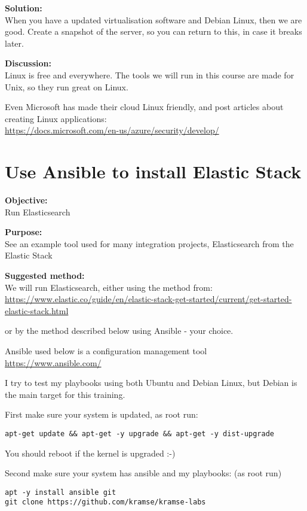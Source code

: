 \documentclass[a4paper,11pt,notitlepage]{report}
\begin{document}

{\bf Solution:}\\
When you have a updated virtualisation software and Debian Linux, then we are good.
Create a snapshot of the server, so you can return to this, in case it breaks later.

{\bf Discussion:}\\
Linux is free and everywhere. The tools we will run in this course are made for Unix, so they run great on Linux.

Even Microsoft has made their cloud Linux friendly, and post articles about creating Linux applications:\\
\url{https://docs.microsoft.com/en-us/azure/security/develop/}



\chapter{Use Ansible to install Elastic Stack}
\label{ex:basicansible}


{\bf Objective:}\\
Run Elasticsearch

{\bf Purpose:}\\
See an example tool used for many integration projects, Elasticsearch from the Elastic Stack

{\bf Suggested method:}\\
We will run Elasticsearch, either using the method from:\\{\footnotesize
\url{https://www.elastic.co/guide/en/elastic-stack-get-started/current/get-started-elastic-stack.html}}

or by the method described below using Ansible - your choice.

Ansible used below is a configuration management tool \url{https://www.ansible.com/}

I try to test my playbooks using both Ubuntu and Debian Linux, but Debian is the main target for this training.

First make sure your system is updated, as root run:

\begin{verbatim}
apt-get update && apt-get -y upgrade && apt-get -y dist-upgrade
\end{verbatim}

You should reboot if the kernel is upgraded :-)

Second make sure your system has ansible and my playbooks: (as root run)
\begin{verbatim}
apt -y install ansible git
git clone https://github.com/kramse/kramse-labs
\end{verbatim}
\end{document}

